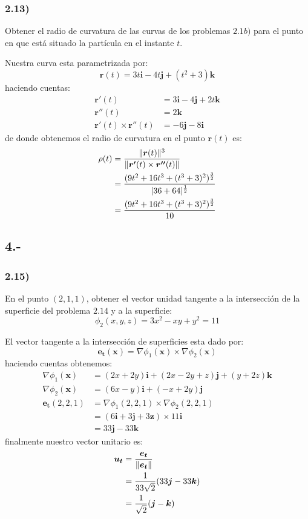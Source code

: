 \documentclass{article}
\DeclarePairedDelimiter{\norm}{\lVert}{\rVert}
\begin{document}
\subsubsection*{2.13)}
Obtener el radio de curvatura de las curvas de los problemas $2.1 b)$ para el punto en que está situado la partícula en el instante $t$.
\begin{tcolorbox}
Nuestra curva esta parametrizada por:
\[ \bm{r}(t) = 3t\bm{i} - 4t\bm{j} + (t^2 + 3)\bm{k}\] 
haciendo cuentas:
\begin{align*}
    \bm{r'}(t) &= 3\bm{i} - 4\bm{j} + 2t\bm{k} \\
    \bm{r''}(t) &= 2\bm{k} \\
    \bm{r'}(t) \times \bm{r''}(t) &= -6\bm{j} - 8\bm{i}
\end{align*}
de donde obtenemos el radio de curvatura en el punto $\bm{r}(t)$ es:
\begin{align*}
    \rho(t) &= \frac
    {\norm{\bm{r}(t)}^3}
    {\norm{\bm{r'}(t) \times \bm{r''}(t)}} \\
    &= \frac
    {(9t^2 + 16t^3 + (t^3+3)^2)^\frac{3}{2}}
    {|36 + 64|^\frac{1}{2}} \\
    &= \frac
    {(9t^2 + 16t^3 + (t^3+3)^2)^\frac{3}{2}}
    {10}
\end{align*}
\end{tcolorbox}

\subsection*{4.-}
\subsubsection*{2.15)}
En el punto $(2,1,1)$, obtener el vector unidad tangente a la intersección de la 
superficie del problema $2.14$ y a la superficie:
\[ \phi_2(x,y,z) = 3x^2-xy+y^2=11\]
\begin{tcolorbox}
    El vector tangente a la intersección de superficies esta dado por:
    \[ \bm{e_t}(\bm{x}) = \nabla \phi_1 (\bm{x}) \times \nabla \phi_2 (\bm{x}) \]
    haciendo cuentas obtenemos:
    \begin{align*}
        \nabla \phi_1 (\bm{x})
        &= (2x+2y)\bm{i} + (2x-2y+z)\bm{j} + (y+2z)\bm{k}\\
        \nabla \phi_2 (\bm{x})
        &= (6x-y)\bm{i} + (-x+2y)\bm{j}\\
        \bm{e_t}(2,2,1)
        &=\nabla \phi_1(2,2,1) \times \nabla \phi_2(2,2,1) \\
        &= (6\bm{i} + 3\bm{j} + 3\bm{z}) \times 11\bm{i} \\
        &= 33\bm{j} -33\bm{k}
    \end{align*}
    finalmente nuestro vector unitario es:
    \begin{align*}
        \bm{u_t} 
        &= \frac{\bm{e_t}}{\norm{\bm{e_t}}} \\
        &= \frac{1}{33\sqrt{2}} (33\bm{j} -33\bm{k}) \\
        &= \frac{1}{\sqrt{2}} (\bm{j} - \bm{k})
    \end{align*}
\end{tcolorbox}
\end{document}
